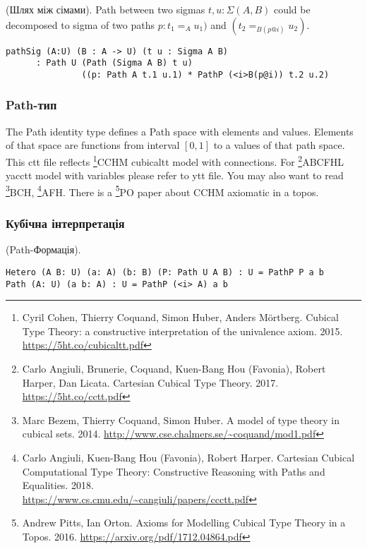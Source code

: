 \begin{theorem} (Шлях між сімами).
Path between two sigmas $t,u: \Sigma(A,B)$ could be decomposed to
sigma of two paths $p:t_1=_{A}u_1)$ and $(t_2=_{B(p@i)}u_2)$.
\begin{lstlisting}
pathSig (A:U) (B : A -> U) (t u : Sigma A B)
      : Path U (Path (Sigma A B) t u)
               ((p: Path A t.1 u.1) * PathP (<i>B(p@i)) t.2 u.2)
\end{lstlisting}
\end{theorem}

\newpage
\subsubsection{Path-тип}
The Path identity type defines a Path space with elements and values.
Elements of that space are functions from interval $[0,1]$ to a values of that path space.
This ctt file reflects \footnote{Cyril Cohen, Thierry Coquand, Simon Huber, Anders M{\"{o}}rtberg. Cubical Type Theory: a constructive interpretation of the univalence axiom. 2015. \url{https://5ht.co/cubicaltt.pdf}}{CCHM} cubicaltt model with connections.
For \footnote{Carlo Angiuli, Brunerie, Coquand, Kuen-Bang Hou (Favonia), Robert Harper, Dan Licata. Cartesian Cubical Type Theory. 2017. \url{https://5ht.co/cctt.pdf}}{ABCFHL} yacctt model with
variables please refer to ytt file. You may also want to
read \footnote{Marc Bezem, Thierry Coquand, Simon Huber. A model of type theory in cubical sets. 2014. \url{http://www.cse.chalmers.se/~coquand/mod1.pdf}}{BCH},
\footnote{Carlo Angiuli, Kuen-Bang Hou (Favonia), Robert Harper. Cartesian Cubical Computational Type Theory: Constructive Reasoning with Paths and Equalities. 2018. \\ \url{https://www.cs.cmu.edu/~cangiuli/papers/ccctt.pdf}}{AFH}.
There is a \footnote{Andrew Pitts, Ian Orton. Axioms for Modelling Cubical Type Theory in a Topos. 2016. \url{https://arxiv.org/pdf/1712.04864.pdf}}{PO} paper about CCHM axiomatic in a topos.

\subsubsection{Кубічна інтерпретація}

\begin{definition} (Path-Формація).
\begin{lstlisting}
Hetero (A B: U) (a: A) (b: B) (P: Path U A B) : U = PathP P a b
Path (A: U) (a b: A) : U = PathP (<i> A) a b
\end{lstlisting}
\end{definition}

